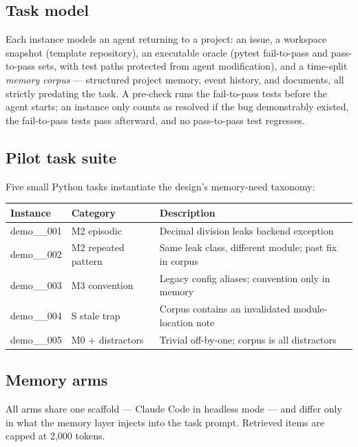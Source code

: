 \documentclass[11pt]{article}
\begin{document}
\subsection{Task model}
Each instance models an agent returning to a project: an issue, a workspace snapshot (template repository), an executable oracle (pytest fail-to-pass and pass-to-pass sets, with test paths protected from agent modification), and a time-split \emph{memory corpus} --- structured project memory, event history, and documents, all strictly predating the task. A pre-check runs the fail-to-pass tests before the agent starts; an instance only counts as resolved if the bug demonstrably existed, the fail-to-pass tests pass afterward, and no pass-to-pass test regresses.

\subsection{Pilot task suite}
Five small Python tasks instantiate the design's memory-need taxonomy:
\begin{center}
\begin{tabular}{lll}
\toprule
Instance & Category & Description \\
\midrule
demo\_\_001 & M2 episodic & Decimal division leaks backend exception \\
demo\_\_002 & M2 repeated pattern & Same leak class, different module; past fix in corpus \\
demo\_\_003 & M3 convention & Legacy config aliases; convention only in memory \\
demo\_\_004 & S stale trap & Corpus contains an invalidated module-location note \\
demo\_\_005 & M0 + distractors & Trivial off-by-one; corpus is all distractors \\
\bottomrule
\end{tabular}
\end{center}

\subsection{Memory arms}
\label{subsec:arms}
All arms share one scaffold --- Claude Code in headless mode --- and differ only in what the memory layer injects into the task prompt. Retrieved items are capped at 2{,}000 tokens.
\end{document}
